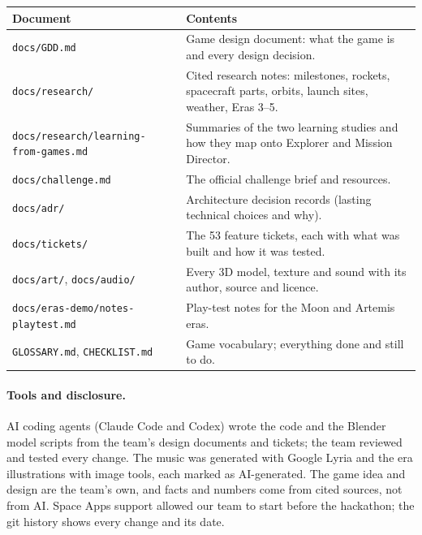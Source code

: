 \documentclass[11pt,a4paper]{article}
\begin{document}
\begin{table}[H]
\centering\small
\begin{tabularx}{\textwidth}{@{}l L@{}}
\toprule
\textbf{Document} & \textbf{Contents} \\
\midrule
\texttt{docs/GDD.md} & Game design document: what the game is and every design decision. \\
\texttt{docs/research/} & Cited research notes: milestones, rockets, spacecraft parts, orbits, launch sites, weather, Eras 3--5. \\
\texttt{docs/research/learning-from-games.md} & Summaries of the two learning studies and how they map onto Explorer and Mission Director. \\
\texttt{docs/challenge.md} & The official challenge brief and resources. \\
\texttt{docs/adr/} & Architecture decision records (lasting technical choices and why). \\
\texttt{docs/tickets/} & The 53 feature tickets, each with what was built and how it was tested. \\
\texttt{docs/art/}, \texttt{docs/audio/} & Every 3D model, texture and sound with its author, source and licence. \\
\texttt{docs/eras-demo/notes-playtest.md} & Play-test notes for the Moon and Artemis eras. \\
\texttt{GLOSSARY.md}, \texttt{CHECKLIST.md} & Game vocabulary; everything done and still to do. \\
\bottomrule
\end{tabularx}
\end{table}

\paragraph{Tools and disclosure.} AI coding agents (Claude Code and Codex) wrote the code and the Blender model
scripts from the team's design documents and tickets; the team reviewed and tested every change. The music was
generated with Google Lyria and the era illustrations with image tools, each marked as AI-generated. The game idea
and design are the team's own, and facts and numbers come from cited sources, not from AI. Space Apps support
allowed our team to start before the hackathon; the git history shows every change and its date.
\end{document}
